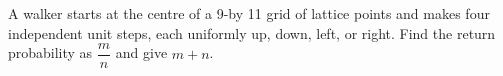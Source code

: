 A walker starts at the centre of a 9-by 11 grid of lattice points and makes four independent unit steps, each uniformly up, down, left, or right. Find the return probability as $\dfrac{m}{n}$ and give $m+n$.
